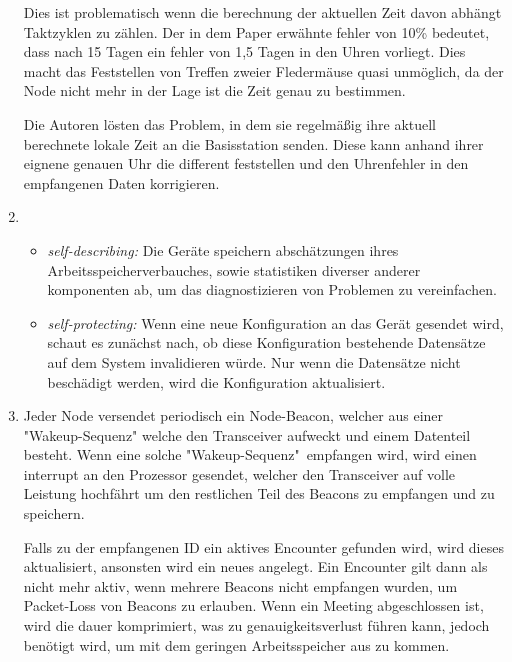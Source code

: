 \begin{enumerate}
        Dies ist problematisch wenn die berechnung der aktuellen Zeit davon abhängt Taktzyklen zu zählen. Der in dem Paper erwähnte fehler von 10\% bedeutet, dass nach 15 Tagen ein fehler von 1,5 Tagen in den Uhren vorliegt. Dies macht das Feststellen von Treffen zweier Fledermäuse quasi unmöglich, da der Node nicht mehr in der Lage ist die Zeit genau zu bestimmen.

        Die Autoren lösten das Problem, in dem sie regelmäßig ihre aktuell berechnete lokale Zeit an die Basisstation senden. Diese kann anhand ihrer eignene genauen Uhr die different feststellen und den Uhrenfehler in den empfangenen Daten korrigieren.
        
        \item \begin{itemize}
            \item \emph{self-describing:} Die Geräte speichern abschätzungen ihres Arbeitsspeicherverbauches, sowie statistiken diverser anderer komponenten ab, um das diagnostizieren von Problemen zu vereinfachen.
            \item \emph{self-protecting:} Wenn eine neue Konfiguration an das Gerät gesendet wird, schaut es zunächst nach, ob diese Konfiguration bestehende Datensätze auf dem System invalidieren würde. Nur wenn die Datensätze nicht beschädigt werden, wird die Konfiguration aktualisiert.
        \end{itemize}

        \item Jeder Node versendet periodisch ein Node-Beacon, welcher aus einer "Wakeup-Sequenz" welche den Transceiver aufweckt und einem Datenteil besteht. Wenn eine solche "Wakeup-Sequenz"\, empfangen wird, wird einen interrupt an den Prozessor gesendet, welcher den Transceiver auf volle Leistung hochfährt um den restlichen Teil des Beacons zu empfangen und zu speichern. 
        
        Falls zu der empfangenen ID ein aktives Encounter gefunden wird, wird dieses aktualisiert, ansonsten wird ein neues angelegt. Ein Encounter gilt dann als nicht mehr aktiv, wenn mehrere Beacons nicht empfangen wurden, um Packet-Loss von Beacons zu erlauben. Wenn ein Meeting abgeschlossen ist, wird die dauer komprimiert, was zu genauigkeitsverlust führen kann, jedoch benötigt wird, um mit dem geringen Arbeitsspeicher aus zu kommen.
        
    \end{enumerate}
